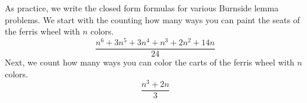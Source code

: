 \documentclass[12pt]{report}
\begin{document}
As practice, we write the closed form formulas for various Burnside lemma problems. We start with the counting how many ways you can paint the seats of the ferris wheel with $n$ colors. 
$$\frac{n^6 + 3n^5 + 3n^4 + n^3 + 2n^2 + 14n}{24}$$
Next, we count how many ways you can color the carts of the ferris wheel with $n$ colors.
$$\frac{n^3 + 2n}{3}$$
\end{document}
